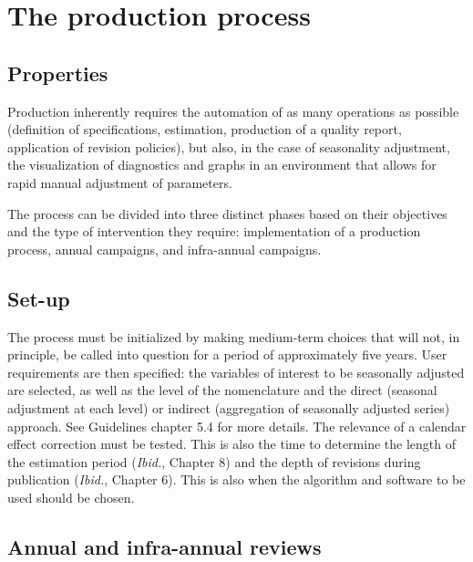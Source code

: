 \documentclass[
  letterpaper,
  DIV=11,
  numbers=noendperiod]{scrreprt}
\begin{document}
\hypertarget{the-production-process}{%
\section*{The production process}\label{the-production-process}}


\hypertarget{properties}{%
\subsection*{Properties}\label{properties}}

Production inherently requires the automation of as many operations as
possible (definition of specifications, estimation, production of a
quality report, application of revision policies), but also, in the case
of seasonality adjustment, the visualization of diagnostics and graphs
in an environment that allows for rapid manual adjustment of parameters.

The process can be divided into three distinct phases based on their
objectives and the type of intervention they require: implementation of
a production process, annual campaigns, and infra-annual campaigns.

\hypertarget{set-up}{%
\subsection*{Set-up}\label{set-up}}

The process must be initialized by making medium-term choices that will
not, in principle, be called into question for a period of approximately
five years. User requirements are then specified: the variables of
interest to be seasonally adjusted are selected, as well as the level of
the nomenclature and the direct (seasonal adjustment at each level) or
indirect (aggregation of seasonally adjusted series) approach. See
Guidelines chapter 5.4 for more details. The relevance of a calendar
effect correction must be tested. This is also the time to determine the
length of the estimation period (\emph{Ibid.}, Chapter 8) and the depth
of revisions during publication (\emph{Ibid.}, Chapter 6). This is also
when the algorithm and software to be used should be chosen.

\hypertarget{annual-and-infra-annual-reviews}{%
\subsection*{Annual and infra-annual
reviews}\label{annual-and-infra-annual-reviews}}
\end{document}

